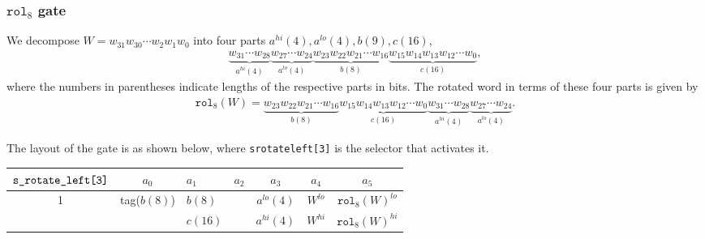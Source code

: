 \documentclass[10pt]{article}
\begin{document}
\subsubsection{$\texttt{rol}_8$ gate}%
\label{sec:rol_8_gate}
We decompose $W = w_{31}w_{30}\cdots w_2w_1w_0$ into four parts $a^{hi}(4), a^{lo}(4), b(9), c(16)$,
\begin{align*}
  \underbrace{w_{31}\cdots w_{28}}_{a^{hi}(4)} \underbrace{w_{27}\cdots w_{24}}_{a^{lo}(4)}
  \underbrace{w_{23}w_{22}w_{21}\cdots w_{16}}_{b(8)} \underbrace{w_{15}w_{14}w_{13}w_{12}\cdots w_{0}}_{c(16)},
\end{align*}
where the numbers in parentheses indicate lengths of the respective parts in bits. The rotated word in terms of these four parts is given by
\begin{align*}
  \texttt{rol}_8(W) = 
  \underbrace{w_{23}w_{22}w_{21}\cdots w_{16}}_{b(8)} \underbrace{w_{15}w_{14}w_{13}w_{12}\cdots w_{0}}_{c(16)}
\underbrace{w_{31}\cdots w_{28}}_{a^{hi}(4)} \underbrace{w_{27}\cdots w_{24}}_{a^{lo}(4)}.
\end{align*}

The layout of the gate is as shown below, where \texttt{s\textunderscore rotate\textunderscore left[3]} is the selector that activates it.

\begin{center}
  \begin{tabular}{c|c|l|l|c|c|c}
    $\texttt{s\textunderscore rotate\textunderscore left[3]}$ & $a_0$ & $a_1$ & $a_2$ & $a_3$ & $a_4$ & $a_5$ \\ \hline
    1  & tag($b(8)$) & $b(8)$ &                        & $a^{lo}(4)$ & $W^{lo}$  & $\texttt{rol}_8(W)^{lo}$  \\ 
       &              & $c(16)$ &                        & $a^{hi}(4)$ & $W^{hi}$  & $\texttt{rol}_8(W)^{hi}$  \\ \hline
  \end{tabular}
\end{center}
\end{document}
